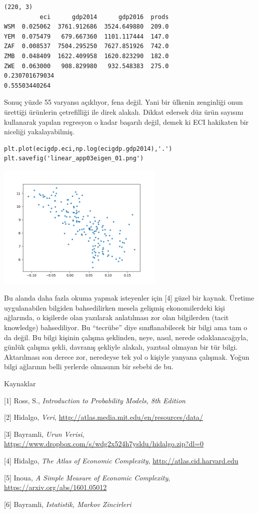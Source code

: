 \documentclass[12pt,fleqn]{article}\usepackage{../../common}
\begin{document}
\begin{verbatim}
(220, 3)
          eci      gdp2014      gdp2016  prods
WSM  0.025062  3761.912686  3524.649880  209.0
YEM  0.075479   679.667360  1101.117444  147.0
ZAF  0.008537  7504.295250  7627.851926  742.0
ZMB  0.048409  1622.409958  1620.823290  182.0
ZWE  0.063000   908.829980   932.548383  275.0
0.230701679034
0.55503440264
\end{verbatim}

Sonuç yüzde 55 varyansı açıklıyor, fena değil. Yani bir ülkenin zenginliği
onun ürettiği ürünlerin çetrefilliği ile direk alakalı. Dikkat edersek düz
ürün sayısını kullanarak yapılan regresyon o kadar başarılı değil, demek ki
ECI hakikaten bir niceliği yakalayabilmiş.

\begin{verbatim}
plt.plot(ecigdp.eci,np.log(ecigdp.gdp2014),'.')
plt.savefig('linear_app03eigen_01.png')
\end{verbatim}

\includegraphics[height=6cm]{linear_app03eigen_01.png}

Bu alanda daha fazla okuma yapmak isteyenler için [4] güzel bir
kaynak. Üretime uygulanabilen bilgiden bahsedilirken mesela gelişmiş
ekonomilerdeki kişi ağlarında, o kişilerde olan yazılarak anlatılması zor
olan bilgilerden (tacit knowledge) bahsediliyor. Bu ``tecrübe'' diye
sınıflanabilecek bir bilgi ama tam o da değil. Bu bilgi kişinin çalışma
şeklinden, neye, nasıl, nerede odaklanacağıyla, günlük çalışma şekli,
davranış şekliyle alakalı, yazıtsal olmayan bir tür bilgi. Aktarılması son
derece zor, neredeyse tek yol o kişiyle yanyana çalışmak. Yoğun bilgi
ağlarının belli yerlerde olmasının bir sebebi de bu.

Kaynaklar

[1] Ross, S., {\em Introduction to Probability Models, 8th Edition}

[2] Hidalgo, {\em Veri}, \url{http://atlas.media.mit.edu/en/resources/data/}

[3] Bayramli, {\em Urun Verisi}, \url{https://www.dropbox.com/s/wdg2x524h7ysldu/hidalgo.zip?dl=0}

[4] Hidalgo, {\em The Atlas of Economic Complexity}, \url{http://atlas.cid.harvard.edu}

[5] Inoua, {\em A Simple Measure of Economic Complexity}, \url{https://arxiv.org/abs/1601.05012}

[6] Bayramli, {\em Istatistik, Markov Zincirleri}
\end{document}
